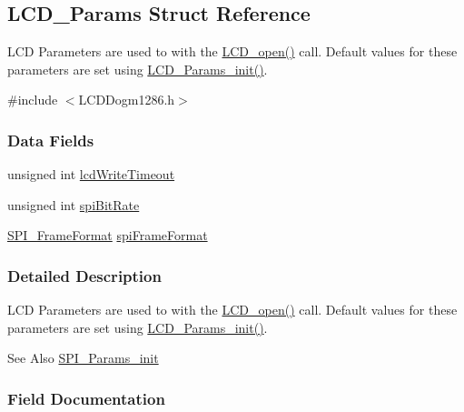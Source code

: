 \subsection{L\-C\-D\-\_\-\-Params Struct Reference}
\label{struct_l_c_d___params}


L\-C\-D Parameters are used to with the \hyperlink{_l_c_d_dogm1286_8h_a7eda62cc528319af943746da6b5d7688}{L\-C\-D\-\_\-open()} call. Default values for these parameters are set using \hyperlink{_l_c_d_dogm1286_8h_a65cc6910ac18d5d823205870acaf3dc3}{L\-C\-D\-\_\-\-Params\-\_\-init()}.  




{\ttfamily \#include $<$L\-C\-D\-Dogm1286.\-h$>$}

\subsubsection*{Data Fields}
\begin{DoxyCompactItemize}
\item 
unsigned int \hyperlink{struct_l_c_d___params_a4d0eed4a93a0785c12eb26c48be77a28}{lcd\-Write\-Timeout}
\item 
unsigned int \hyperlink{struct_l_c_d___params_a5670d1d33180c428d0b84154ca658098}{spi\-Bit\-Rate}
\item 
\hyperlink{_s_p_i_8h_a4e1f33555dfa8147205af5b266f3a489}{S\-P\-I\-\_\-\-Frame\-Format} \hyperlink{struct_l_c_d___params_a27584b38ae256abf6358c4158da5be60}{spi\-Frame\-Format}
\end{DoxyCompactItemize}


\subsubsection{Detailed Description}
L\-C\-D Parameters are used to with the \hyperlink{_l_c_d_dogm1286_8h_a7eda62cc528319af943746da6b5d7688}{L\-C\-D\-\_\-open()} call. Default values for these parameters are set using \hyperlink{_l_c_d_dogm1286_8h_a65cc6910ac18d5d823205870acaf3dc3}{L\-C\-D\-\_\-\-Params\-\_\-init()}. 

\begin{DoxySeeAlso}{See Also}
\hyperlink{_s_p_i_8h_a9c3dd1748332fd6e31c79a6538a71642}{S\-P\-I\-\_\-\-Params\-\_\-init} 
\end{DoxySeeAlso}


\subsubsection{Field Documentation}
